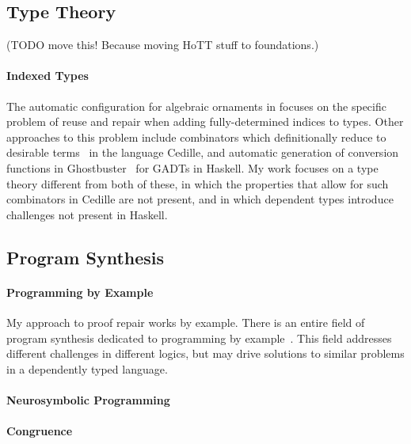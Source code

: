 \subsection{Type Theory}
\label{sec:typetheory}

(TODO move this! Because moving HoTT stuff to foundations.)

\paragraph{Indexed Types}
The automatic configuration for algebraic ornaments in \toolnamec focuses on the specific problem of reuse and repair when adding fully-determined indices to types.
Other approaches to this problem include combinators which definitionally reduce to desirable terms~\cite{DBLP:journals/corr/abs-1803-08150} in the language Cedille,
and automatic generation of conversion functions in Ghostbuster~\cite{McDonell:2016:GTS:2951913.2951914} for GADTs in Haskell.
My work focuses on a type theory different from both of these, in which the properties that allow for such combinators in Cedille are not present, and in which dependent types introduce challenges not present in Haskell.

\subsection{Program Synthesis}
\label{sec:synthesis}

\paragraph{Programming by Example}
My approach to proof repair works by example.
There is an entire field of program synthesis dedicated to programming by example~\cite{DBLP:journals/ftpl/GulwaniPS17}. 
This field addresses different challenges in different logics,
but may drive solutions to similar problems in a dependently typed language.

\paragraph{Neurosymbolic Programming}

\paragraph{Congruence}

\fi


